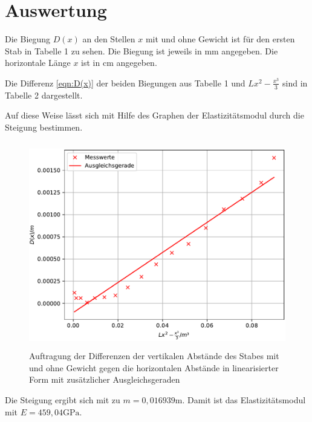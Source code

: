 \section{Auswertung}
\label{sec:Auswertung}

Die Biegung $D(x)$ an den Stellen $x$ mit und ohne Gewicht
ist für den ersten Stab in Tabelle 1 zu sehen. Die Biegung ist %
jeweils in $\si{\mm}$ angegeben.
Die horizontale Länge $x$ ist in $\si{\cm}$ angegeben.


Die Differenz \eqref{eqn:D(x)} der beiden Biegungen aus Tabelle 1 
und $Lx^2-\frac{x^3}{3}$ sind in Tabelle 2 dargestellt. %


Auf diese Weise lässt sich mit Hilfe des Graphen %
der Elastizitätsmodul durch die Steigung bestimmen. %
\begin{figure}
  \centering
  \includegraphics[width=12cm, height=9cm]{./plots/Stange1.pdf}
  \caption{Auftragung der Differenzen der vertikalen Abstände des Stabes mit und ohne Gewicht gegen die horizontalen Abstände in linearisierter Form mit zusätzlicher Ausgleichsgeraden}
  \label{fig:plot1}
\end{figure}
Die Steigung ergibt sich mit %
zu $m =0,016939 \si{\meter}$. Damit ist das Elastizitätsmodul mit %
$E = 459,04 \si{\giga\pascal}$.





